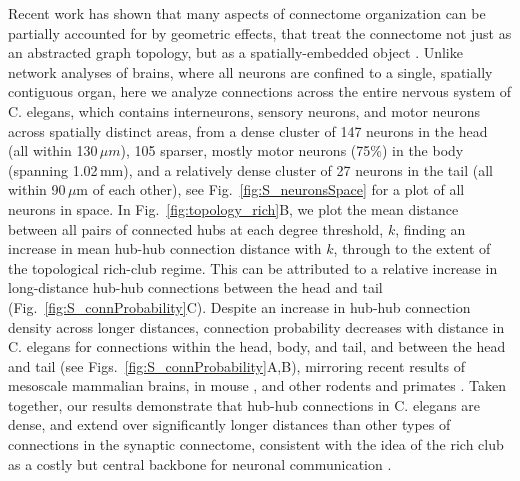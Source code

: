 \documentclass[10pt,letterpaper]{article}
\begin{document}
Recent work has shown that many aspects of connectome organization can be partially accounted for by geometric effects, that treat the connectome not just as an abstracted graph topology, but as a spatially-embedded object \cite{Henderson:2014fg, Roberts2016, Horvat:2016ia}.
Unlike network analyses of brains, where all neurons are confined to a single, spatially contiguous organ, here we analyze connections across the entire nervous system of C. elegans, which contains interneurons, sensory neurons, and motor neurons across spatially distinct areas, from a dense cluster of 147 neurons in the head (all within 130\,$\mu m$), 105 sparser, mostly motor neurons (75\%) in the body (spanning 1.02\,mm), and a relatively dense cluster of 27 neurons in the tail (all within 90\,$\mu$m of each other), see Fig.~\ref{fig:S_neuronsSpace} for a plot of all neurons in space.
In Fig.~\ref{fig:topology_rich}B, we plot the mean distance between all pairs of connected hubs at each degree threshold, $k$, finding an increase in mean hub-hub connection distance with $k$, through to the extent of the topological rich-club regime.
This can be attributed to a relative increase in long-distance hub-hub connections between the head and tail (Fig.~\ref{fig:S_connProbability}C).
Despite an increase in hub-hub connection density across longer distances, connection probability decreases with distance in C. elegans for connections within the head, body, and tail, and between the head and tail (see Figs.~\ref{fig:S_connProbability}A,B), mirroring recent results of mesoscale mammalian brains, in mouse \cite{Goulas:2016hr, Fulcher:2016ck}, and other rodents and primates \cite{Horvat:2016ia}.
Taken together, our results demonstrate that hub-hub connections in C. elegans are dense, and extend over significantly longer distances than other types of connections in the synaptic connectome, consistent with the idea of the rich club as a costly but central backbone for neuronal communication \cite{vandenHeuvel:2012kh}.

\end{document}
